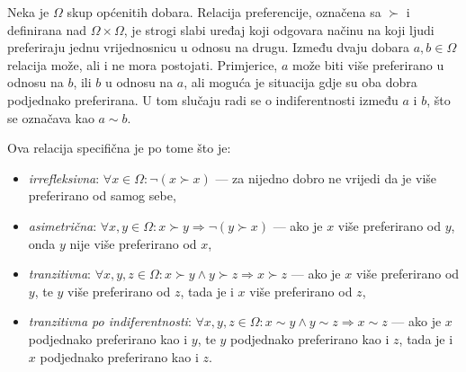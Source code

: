 \documentclass[lmodern, utf8, diplomski, numeric]{fer}
\newcommand{\q}{\left}
\newcommand{\w}{\right}
\begin{document}
  Neka je $\Omega$ skup općenitih dobara.
  Relacija preferencije, označena sa $\succ$ i definirana nad $\Omega \times \Omega$, je strogi slabi uređaj koji odgovara načinu na koji ljudi preferiraju jednu vrijednosnicu u odnosu na drugu.
  Između dvaju dobara $a, b \in \Omega$ relacija može, ali i ne mora postojati.
  Primjerice, $a$ može biti više preferirano u odnosu na $b$, ili $b$ u odnosu na $a$, ali moguća je situacija gdje su oba dobra podjednako preferirana.
  U tom slučaju radi se o indiferentnosti između $a$ i $b$, što se označava kao $a \sim b$.

  Ova relacija specifična je po tome što je:
  \begin{itemize}
    \item \textit{irrefleksivna}: $\forall x \in \Omega\colon \neg \q( x \succ x \w)$ --- za nijedno dobro ne vrijedi da je više preferirano od samog sebe,
    \item \textit{asimetrična}: $\forall x, y \in \Omega\colon x \succ y \Rightarrow \neg \q( y \succ x \w)$ --- ako je $x$ više preferirano od $y$, onda $y$ nije više preferirano od $x$,
    \item \textit{tranzitivna}: $\forall x, y, z \in \Omega\colon x \succ y \wedge y \succ z \Rightarrow x \succ z$ --- ako je $x$ više preferirano od $y$, te $y$ više preferirano od $z$, tada je i $x$ više preferirano od $z$,
    \item \textit{tranzitivna po indiferentnosti}: $\forall x, y, z \in \Omega\colon x \sim y \wedge y \sim z \Rightarrow x \sim z$ --- ako je $x$ podjednako preferirano kao i $y$, te $y$ podjednako preferirano kao i $z$, tada je i $x$ podjednako preferirano kao i $z$.
  \end{itemize}
  
\end{document}
